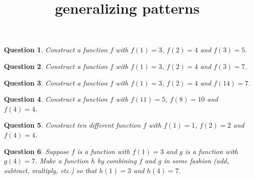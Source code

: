 \documentclass[12pt]{article}
\title{generalizing patterns}
\theoremstyle{plain}
\newtheorem{QQ}{Question}
\begin{document}
\maketitle

\begin{QQ}
Construct a function $f$ with $f(1) = 3$, $f(2) = 4$ and $f(3) = 5$.
\end{QQ}

\begin{QQ}
Construct a function $f$ with $f(1) = 3$, $f(2) = 4$ and $f(3) = 7$.
\end{QQ}

\begin{QQ}
Construct a function $f$ with $f(1) = 3$, $f(2) = 4$ and $f(14) = 7$.
\end{QQ}
\begin{QQ}
Construct a function $f$ with $f(11) = 5$, $f(8) = 10$ and $f(4) = 4$.
\end{QQ}
\begin{QQ}
Construct ten different function $f$ with $f(1) = 1$, $f(2) = 2$ and $f(4) = 4$.
\end{QQ}
\begin{QQ}
Suppose $f$ is a function with $f(1) = 3$ and $g$ is a function with $g(4) = 7$.  Make a function $h$
by combining $f$ and $g$ in some fashion (add, subtract, multiply, etc.) so that $h(1) = 3$ and  $h(4) = 7$.
\end{QQ}
\end{document}
